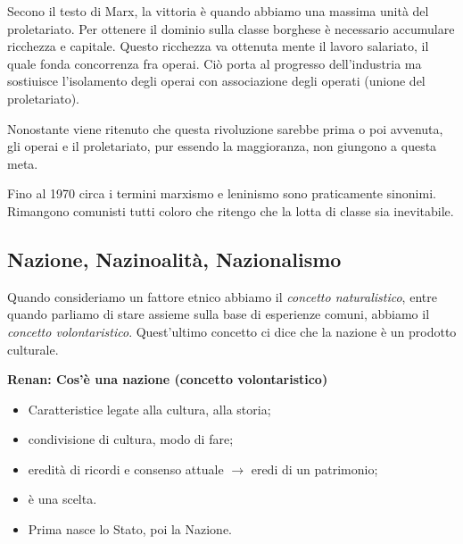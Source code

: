 \documentclass[a4paper]{article}
\begin{document}
Secono il testo di Marx, la vittoria è quando abbiamo una massima unità del proletariato.
Per ottenere il dominio sulla classe borghese è necessario accumulare ricchezza e capitale.
Questo ricchezza va ottenuta mente il lavoro salariato, il quale fonda concorrenza fra operai.
Ciò porta al progresso dell'industria ma sostiuisce l'isolamento degli operai con associazione degli operati (unione del proletariato).

Nonostante viene ritenuto che questa rivoluzione sarebbe prima o poi avvenuta, gli operai e il proletariato,
pur essendo la maggioranza, non giungono a questa meta.

Fino al 1970 circa i termini marxismo e leninismo sono praticamente sinonimi.
Rimangono comunisti tutti coloro che ritengo che la lotta di classe sia inevitabile.

\pagebreak

\subsection{Nazione, Nazinoalità, Nazionalismo}


Quando consideriamo un fattore etnico abbiamo il \textit{concetto naturalistico},
entre quando parliamo di stare assieme sulla base di esperienze comuni, abbiamo il \textit{concetto volontaristico}.
Quest'ultimo concetto ci dice che la nazione è un prodotto culturale.

\textbf{Renan: Cos'è una nazione (concetto volontaristico)}
\begin{itemize}
    \item Caratteristice legate alla cultura, alla storia;
    \item condivisione di cultura, modo di fare;
    \item eredità di ricordi e consenso attuale \(\rightarrow\) eredi di un patrimonio;
    \item è una scelta.
    \item Prima nasce lo Stato, poi la Nazione.
\end{itemize}
\end{document}
